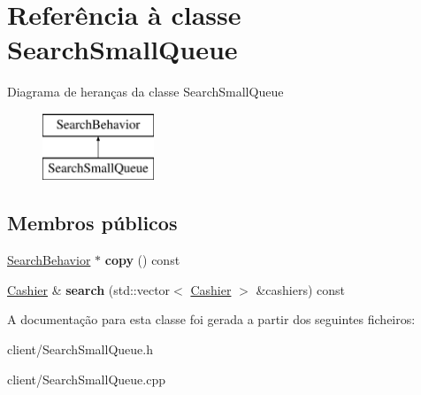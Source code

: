 \hypertarget{classSearchSmallQueue}{\section{Referência à classe Search\-Small\-Queue}
\label{d3/d22/classSearchSmallQueue}
}
Diagrama de heranças da classe Search\-Small\-Queue\begin{figure}[H]
\begin{center}
\leavevmode
\includegraphics[height=2.000000cm]{d3/d22/classSearchSmallQueue}
\end{center}
\end{figure}
\subsection*{Membros públicos}
\begin{DoxyCompactItemize}
\item 
\hypertarget{classSearchSmallQueue_a060043acfc959d9fc046b99f19518401}{\hyperlink{classSearchBehavior}{Search\-Behavior} $\ast$ {\bfseries copy} () const }\label{d3/d22/classSearchSmallQueue_a060043acfc959d9fc046b99f19518401}

\item 
\hypertarget{classSearchSmallQueue_a78dabc28e376fdf7b38b75c31f46f9d1}{\hyperlink{classCashier}{Cashier} \& {\bfseries search} (std\-::vector$<$ \hyperlink{classCashier}{Cashier} $>$ \&cashiers) const }\label{d3/d22/classSearchSmallQueue_a78dabc28e376fdf7b38b75c31f46f9d1}

\end{DoxyCompactItemize}


A documentação para esta classe foi gerada a partir dos seguintes ficheiros\-:\begin{DoxyCompactItemize}
\item 
client/Search\-Small\-Queue.\-h\item 
client/Search\-Small\-Queue.\-cpp\end{DoxyCompactItemize}
